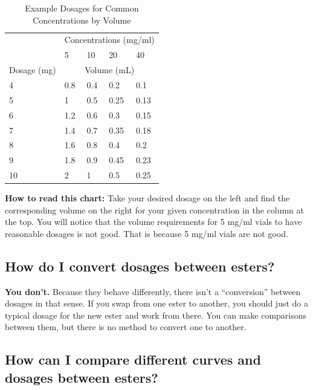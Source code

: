 \documentclass{article}
\begin{document}
\begin{table}
\centering
\caption{Example Dosages for Common Concentrations by Volume}
\label{tab:concentrations}
\begin{tabular}{@{}lllll@{}}
    \toprule
    \multicolumn{1}{c}{} & \multicolumn{4}{c}{Concentrations (mg/ml)} \\
    \cmidrule(rl){2-5}
            & 5    & 10  & 20 & 40    \\
            \cmidrule(rl){2-5}
Dosage (mg) & \multicolumn{4}{c}{Volume (mL)}  \\
    \cmidrule(r){1-1} \cmidrule(lr){2-5} 
4        & 0.8  & 0.4 & 0.2  & 0.1      \\
5        & 1    & 0.5 & 0.25 & 0.13   \\
6        & 1.2  & 0.6   & 0.3  & 0.15     \\
7        & 1.4  & 0.7 & 0.35  & 0.18  \\
8        & 1.6  & 0.8   & 0.4  & 0.2    \\
9        & 1.8  & 0.9 & 0.45  & 0.23 \\
10       & 2    & 1   & 0.5  & 0.25   \\
    \bottomrule
\end{tabular}
\end{table}

\textbf{How to read this chart:} Take your desired dosage on the left and find the corresponding volume on the right for your given concentration in the column at the top. You will notice that the volume requirements for 5 mg/ml vials to have reasonable dosages is not good. That is because 5 mg/ml vials are not good. 

\subsection{How do I convert dosages between esters?}

\textbf{You don’t. }Because they behave differently, there isn’t a “conversion” between dosages in that sense. If you swap from one ester to another, you should just do a typical dosage for the new ester and work from there. You can make comparisons between them, but there is no method to convert one to another.

\subsection{How can I compare different curves and dosages between esters?}
\end{document}
